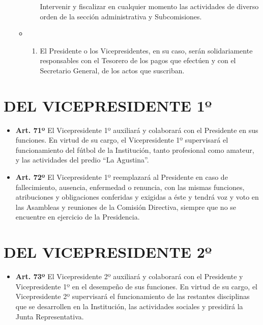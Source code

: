 \documentclass[]{book}
\providecommand{\tightlist}{%
  \setlength{\itemsep}{0pt}\setlength{\parskip}{0pt}}
\begin{document}
\begin{itemize}
\begin{itemize}
\begin{enumerate}
      Intervenir y fiscalizar en cualquier momento las actividades de diverso orden de la sección administrativa y Subcomisiones.
    \end{enumerate}
  \item
    \begin{enumerate}
    \def\labelenumi{\alph{enumi})}
    \setcounter{enumi}{12}
    \tightlist
    \item
      El Presidente o los Vicepresidentes, en su caso, serán solidariamente responsables con el Tesorero de los pagos que efectúen y con el Secretario General, de los actos que suscriban.
    \end{enumerate}
  \end{itemize}
\end{itemize}

\hypertarget{cap9}{%
\chapter{DEL VICEPRESIDENTE 1º}\label{cap9}}

\begin{itemize}
\tightlist
\item
  \textbf{Art. 71º}
  El Vicepresidente 1º auxiliará y colaborará con el Presidente en sus funciones. En virtud de su cargo, el Vicepresidente 1º supervisará el funcionamiento del fútbol de la Institución, tanto profesional como amateur, y las actividades del predio ``La Agustina''.
\end{itemize}

\begin{itemize}
\tightlist
\item
  \textbf{Art. 72º}
  El Vicepresidente 1º reemplazará al Presidente en caso de fallecimiento, ausencia, enfermedad o renuncia, con las mismas funciones, atribuciones y obligaciones conferidas y exigidas a éste y tendrá voz y voto en las Asambleas y reuniones de la Comisión Directiva, siempre que no se encuentre en ejercicio de la Presidencia.
\end{itemize}

\hypertarget{cap10}{%
\chapter{DEL VICEPRESIDENTE 2º}\label{cap10}}

\begin{itemize}
\tightlist
\item
  \textbf{Art. 73º}
  El Vicepresidente 2º auxiliará y colaborará con el Presidente y Vicepresidente 1º en el desempeño de sus funciones. En virtud de su cargo, el Vicepresidente 2º supervisará el funcionamiento de las restantes disciplinas que se desarrollen en la Institución, las actividades sociales y presidirá la Junta Representativa.
\end{itemize}
\end{document}
